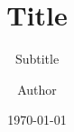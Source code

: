 \documentclass[aspectratio=169,10pt]{beamer}
\title{Title}
\subtitle{Subtitle}
\author{Author}
\date{\today}
\begin{document}
\begin{frame}
  \titlepage
\end{frame}

\end{document}
